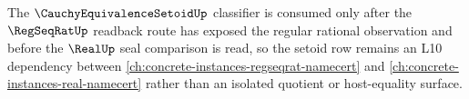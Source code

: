 The $\CauchyEquivalenceSetoidUp$ classifier is consumed only after the $\RegSeqRatUp$ readback route has exposed the regular rational observation and before the $\RealUp$ seal comparison is read, so the setoid row remains an L10 dependency between \autoref{ch:concrete-instances-regseqrat-namecert} and \autoref{ch:concrete-instances-real-namecert} rather than an isolated quotient or host-equality surface.
